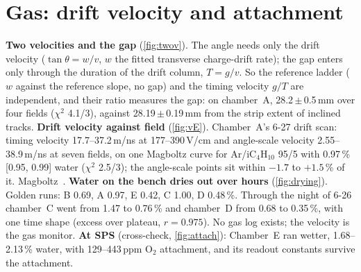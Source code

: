 \section{Gas: drift velocity and attachment}\label{sec:gas}

\textbf{Two velocities and the gap} (\cref{fig:twov}). The angle needs only the drift velocity ($\tan\theta=w/v$,
$w$ the fitted transverse charge-drift rate); the gap enters only through the duration of the drift column, $T=g/v$. So
the reference ladder ($w$ against the reference slope, no gap) and the timing velocity $g/T$ are independent, and their ratio measures
the gap: on chamber~A, 28.2\,$\pm$\,0.5\,mm over four fields ($\chi^2$ 4.1/3), against 28.19\,$\pm$\,0.19\,mm from the strip
extent of inclined tracks.
\textbf{Drift velocity against field} (\cref{fig:vE}). Chamber~A's 6-27 drift scan: timing velocity 17.7--37.2\,\textmu m/ns at
177--390\,V/cm and angle-scale velocity 2.55--38.9\,\textmu m/ns at seven fields, on one Magboltz curve for Ar/iC$_4$H$_{10}$
95/5 with 0.97\,\% [0.95, 0.99] water ($\chi^2$ 2.5/3); the angle-scale points sit within $-1.7$ to $+1.5$\,\% of it.
Magboltz~\cite{Biagi1999}.
\textbf{Water on the bench dries out over hours} (\cref{fig:drying}). Golden runs: B 0.69, A 0.97, E 0.42, C
1.00, D 0.48\,\%. Through the night of 6-26 chamber~C went from 1.47 to 0.76\,\% and chamber~D from 0.68 to 0.35\,\%, with one
time shape (excess over plateau, $r=0.975$). No gas log exists; the velocity is the gas monitor.
\textbf{At SPS} (cross-check, \cref{fig:attach}): Chamber~E ran wetter, 1.68--2.13\,\% water, with 129--443\,ppm O$_2$
attachment, and its readout constants survive the attachment.

